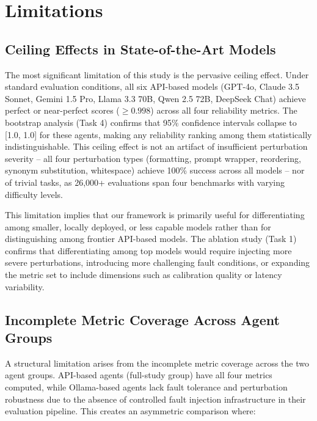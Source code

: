 \section{Limitations}

\subsection{Ceiling Effects in State-of-the-Art Models}

The most significant limitation of this study is the pervasive ceiling effect. Under standard evaluation conditions, all six API-based models (GPT-4o, Claude 3.5 Sonnet, Gemini 1.5 Pro, Llama 3.3 70B, Qwen 2.5 72B, DeepSeek Chat) achieve perfect or near-perfect scores ($\geq 0.998$) across all four reliability metrics. The bootstrap analysis (Task 4) confirms that 95\% confidence intervals collapse to [1.0, 1.0] for these agents, making any reliability ranking among them statistically indistinguishable. This ceiling effect is not an artifact of insufficient perturbation severity -- all four perturbation types (formatting, prompt wrapper, reordering, synonym substitution, whitespace) achieve 100\% success across all models -- nor of trivial tasks, as 26,000+ evaluations span four benchmarks with varying difficulty levels.

This limitation implies that our framework is primarily useful for differentiating among smaller, locally deployed, or less capable models rather than for distinguishing among frontier API-based models. The ablation study (Task 1) confirms that differentiating among top models would require injecting more severe perturbations, introducing more challenging fault conditions, or expanding the metric set to include dimensions such as calibration quality or latency variability.

\subsection{Incomplete Metric Coverage Across Agent Groups}

A structural limitation arises from the incomplete metric coverage across the two agent groups. API-based agents (full-study group) have all four metrics computed, while Ollama-based agents lack fault tolerance and perturbation robustness due to the absence of controlled fault injection infrastructure in their evaluation pipeline. This creates an asymmetric comparison where:

